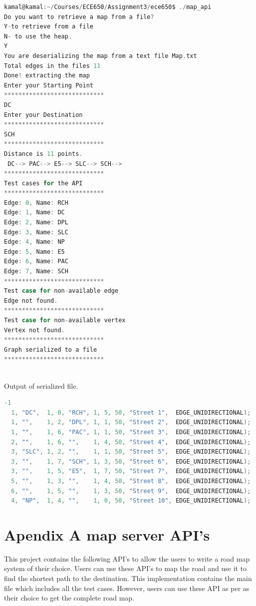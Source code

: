 \documentclass[10pt]{article}
\begin{document}
\begin{lstlisting}[language=C]
kamal@kamal:~/Courses/ECE650/Assignment3/ece650$ ./map_api 
Do you want to retrieve a map from a file? 
Y-to retrieve from a file
N- to use the heap.
Y
You are deserializing the map from a text file Map.txt 
Total edges in the files 11
Done! extracting the map
Enter your Starting Point
****************************
DC
Enter your Destination
****************************
SCH
****************************
Distance is 11 points.
 DC--> PAC--> E5--> SLC--> SCH--> 
****************************
Test cases for the API
****************************
Edge: 0, Name: RCH
Edge: 1, Name: DC
Edge: 2, Name: DPL
Edge: 3, Name: SLC
Edge: 4, Name: NP
Edge: 5, Name: E5
Edge: 6, Name: PAC
Edge: 7, Name: SCH
****************************
Test case for non-available edge
Edge not found. 
****************************
Test case for non-available vertex
Vertex not found. 
****************************
Graph serialized to a file
****************************
\end{lstlisting}\\
\newline
Output of serialized file.
\begin{lstlisting}[language=C]
  -1
  1, "DC",  1, 0, "RCH", 1, 5, 50, "Street 1",  EDGE_UNIDIRECTIONAL);
  1, "",    1, 2, "DPL", 1, 1, 50, "Street 2",  EDGE_UNIDIRECTIONAL);
  1, "",    1, 6, "PAC", 1, 1, 50, "Street 3",  EDGE_UNIDIRECTIONAL);
  2, "",    1, 6, "",    1, 4, 50, "Street 4",  EDGE_UNIDIRECTIONAL);
  3, "SLC", 1, 2, "",    1, 1, 50, "Street 5",  EDGE_UNIDIRECTIONAL);
  3, "",    1, 7, "SCH", 1, 3, 50, "Street 6",  EDGE_UNIDIRECTIONAL);
  3, "",    1, 5, "E5",  1, 7, 50, "Street 7",  EDGE_UNIDIRECTIONAL);
  5, "",    1, 3, "",    1, 4, 50, "Street 8",  EDGE_UNIDIRECTIONAL);
  6, "",    1, 5, "",    1, 3, 50, "Street 9",  EDGE_UNIDIRECTIONAL);
  4, "NP",  1, 4, "",    1, 0, 50, "Street 10", EDGE_UNIDIRECTIONAL);
\end{lstlisting}



\newpage
\section*{Apendix A map server API's\label{sec:APIs}}
This project contains the following API's to allow the users to write a road map
system of their choice. Users can use these API's to map the road and use it to
find the shortest path to the destination. This implementation contains the main
file which includes all the test cases. However, users can use these API as per
as their choice to get the complete road map.
\end{document}
